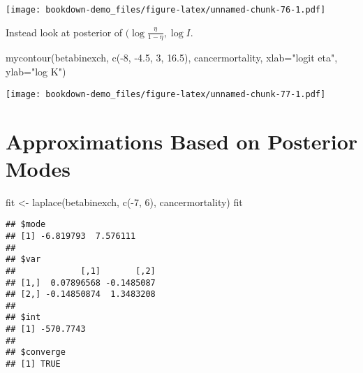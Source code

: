\documentclass[
]{book}
\newenvironment{Shaded}{\begin{snugshade}}{\end{snugshade}}
\newcommand{\AttributeTok}[1]{\textcolor[rgb]{0.77,0.63,0.00}{#1}}
\newcommand{\DecValTok}[1]{\textcolor[rgb]{0.00,0.00,0.81}{#1}}
\newcommand{\FloatTok}[1]{\textcolor[rgb]{0.00,0.00,0.81}{#1}}
\newcommand{\FunctionTok}[1]{\textcolor[rgb]{0.00,0.00,0.00}{#1}}
\newcommand{\NormalTok}[1]{#1}
\newcommand{\OtherTok}[1]{\textcolor[rgb]{0.56,0.35,0.01}{#1}}
\newcommand{\SpecialCharTok}[1]{\textcolor[rgb]{0.00,0.00,0.00}{#1}}
\newcommand{\StringTok}[1]{\textcolor[rgb]{0.31,0.60,0.02}{#1}}
\begin{document}
\texttt{[image: bookdown-demo\_files/figure-latex/unnamed-chunk-76-1.pdf]}

Instead look at posterior of \((\log \frac{\eta}{1-\eta}, \log I\).

\begin{Shaded}
\begin{Highlighting}[]
\FunctionTok{mycontour}\NormalTok{(betabinexch,}
          \FunctionTok{c}\NormalTok{(}\SpecialCharTok{{-}}\DecValTok{8}\NormalTok{, }\SpecialCharTok{{-}}\FloatTok{4.5}\NormalTok{, }\DecValTok{3}\NormalTok{, }\FloatTok{16.5}\NormalTok{),}
\NormalTok{          cancermortality,}
          \AttributeTok{xlab=}\StringTok{"logit eta"}\NormalTok{, }\AttributeTok{ylab=}\StringTok{"log K"}\NormalTok{)}
\end{Highlighting}
\end{Shaded}

\texttt{[image: bookdown-demo\_files/figure-latex/unnamed-chunk-77-1.pdf]}

\hypertarget{approximations-based-on-posterior-modes}{%
\section{Approximations Based on Posterior Modes}\label{approximations-based-on-posterior-modes}}

\begin{Shaded}
\begin{Highlighting}[]
\NormalTok{fit }\OtherTok{\textless{}{-}} \FunctionTok{laplace}\NormalTok{(betabinexch, }
               \FunctionTok{c}\NormalTok{(}\SpecialCharTok{{-}}\DecValTok{7}\NormalTok{, }\DecValTok{6}\NormalTok{), }
\NormalTok{               cancermortality)}
\NormalTok{fit}
\end{Highlighting}
\end{Shaded}

\begin{verbatim}
## $mode
## [1] -6.819793  7.576111
## 
## $var
##             [,1]       [,2]
## [1,]  0.07896568 -0.1485087
## [2,] -0.14850874  1.3483208
## 
## $int
## [1] -570.7743
## 
## $converge
## [1] TRUE
\end{verbatim}

\begin{Shaded}
\end{Shaded}
\end{document}
